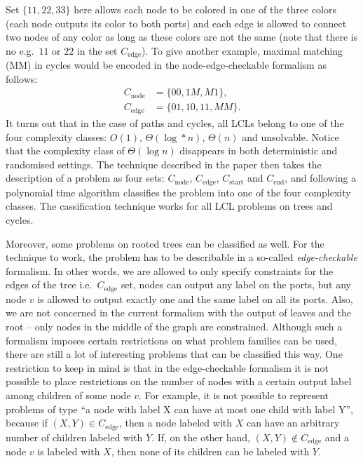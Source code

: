 Set $\{ 11, 22, 33 \}$ here allows each node to be colored in one of the three colors
(each node outputs its color to both ports) and each edge is allowed to connect
two nodes of any color as long as these colors are not the same (note that there is no
e.g.\ $11$ or $22$ in the set $C_{\textrm{edge}}$). To give another example, maximal matching (MM) in cycles
would be encoded in the node-edge-checkable formalism as follows:
\begin{align*}
C_{\textrm{node}} &= \{ 00, 1M, M1 \}, \\
C_{\textrm{edge}} &= \{ 01, 10, 11, MM \}.
\end{align*}
It turns out that in the case of paths and cycles, all LCLs belong to one of the four
complexity classes: $O(1)$, $\Theta(\log* n)$, $\Theta(n)$ and unsolvable. Notice that
the complexity class of $\Theta(\log n)$ disappears in both deterministic and randomised settings.
The technique described in the paper then takes the description of a problem as four sets: $C_{\textrm{node}}$,
$C_{\textrm{edge}}$, $C_{\textrm{start}}$ and $C_{\textrm{end}}$, and following a polynomial time algorithm classifies the
problem into one of the four complexity classes. The cassification technique works for all LCL
problems on trees and cycles.

Moreover, some problems on rooted trees can be classified as well. For the technique to work, the problem
has to be describable in a so-called \emph{edge-checkable} formalism. In other words, we are allowed to
only specify constraints for the edges of the tree i.e.\ $C_{\textrm{edge}}$ set, nodes can output any label
on the ports, but any node $v$ is allowed to output exactly one and the same label on all its ports.
Also, we are not concerned in the current formalism with the output of leaves and the root -- only nodes in the
middle of the graph are constrained. Although such a formalism imposes certain restrictions on what
problem families can be used,
there are still a lot of interesting problems that can be classified this way. One restriction to keep in mind
is that in the edge-checkable formalism it is not possible to
place restrictions on the number of nodes with a certain output label
among children of some node $v$.
For example, it is not possible to represent problems of type
``a node with label X can have at most one child with label Y'',
because if $(X, Y) \in C_{\textrm{edge}}$, then a
node labeled with $X$ can have an arbitrary number of children
labeled with $Y$. If, on the other hand, $(X, Y) \notin C_{\textrm{edge}}$ and a node $v$ is labeled with $X$, then
none of its children can be labeled with $Y$.

